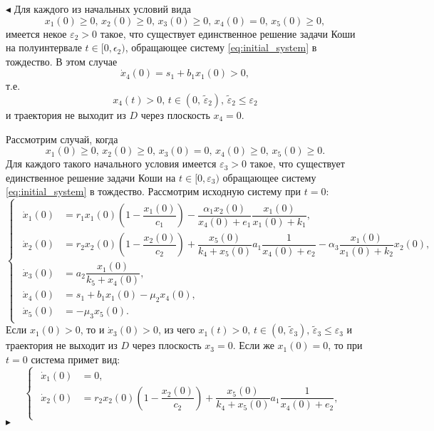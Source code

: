\documentclass[12pt,a4paper]{extarticle}
\renewenvironment{proof}{\noindent$\blacktriangleleft$}{$\blacktriangleright$}
\theoremstyle{definition}
\theoremstyle{definition}
\theoremstyle{definition}
\begin{document}
\begin{proof}
		Для каждого из начальных условий вида
		\begin{equation*}
			x_1(0)\ge0,\, x_2(0)\ge0,\, x_3(0)\ge0,\, x_4(0)=0,\, x_5(0)\ge0,
		\end{equation*}
		имеется некое $\varepsilon_2>0$ такое, что существует единственное решение задачи Коши на полуинтервале $t\in[0,\epsilon_2)$, обращающее систему \ref{eq:initial_system} в тождество. В этом случае 
		\[\dot{x}_4(0)=s_1+b_1x_1(0)>0,\]
		т.е. 
		\[x_4(t)>0,\, t\in(0,\, \tilde{\varepsilon}_2),\,\tilde{\varepsilon}_2\le\varepsilon_2\]
		и траектория не выходит из $D$ через плоскость $x_4=0$.
		
		Рассмотрим случай, когда
		\begin{equation}\label{eq:conds_3}
			x_1(0)\ge0,\, x_2(0)\ge0,\, x_3(0)=0,\, x_4(0)\ge0,\, x_5(0)\ge0.
		\end{equation}
		Для каждого такого начального условия имеется $\varepsilon_3>0$ такое, что существует единственное решение задачи Коши на $t\in[0,\varepsilon_3)$ обращающее систему \ref{eq:initial_system} в тождество. Рассмотрим исходную систему при $t=0$:
		\begin{equation*}
			\begin{cases}
				\begin{aligned}
					\dot{x}_1(0) &= r_1x_1(0)\left(1-\dfrac{x_1(0)}{c_1}\right)-\dfrac{\alpha_1x_2(0)}{x_4(0)+e_1}\dfrac{x_1(0)}{x_1(0)+k_1},\\
					\dot{x}_2(0) &= r_2x_2(0)\left(1-\dfrac{x_2(0)}{c_2}\right)+\dfrac{x_5(0)}{k_4+x_5(0)}a_1\dfrac{1}{x_4(0)+e_2}-\alpha_3\dfrac{x_1(0)}{x_1(0)+k_2}x_2(0),\\
					\dot{x}_3(0) &= a_2\dfrac{x_1(0)}{k_5+x_4(0)},\\
					\dot{x}_4(0) &= s_1 + b_1x_1(0)-\mu_2x_4(0),\\
					\dot{x}_5(0) &= -\mu_3x_5(0).
				\end{aligned}
			\end{cases}
		\end{equation*}
		Если $x_1(0)>0$, то и $\dot{x}_3(0)>0$, из чего $x_1(t)>0,\, t\in(0,\, \tilde{\varepsilon}_3),\,\tilde{\varepsilon}_3\le\varepsilon_3$ и траектория не выходит из $D$ через плоскость $x_3=0$. Если же $x_1(0)=0$, то при $t=0$ система примет вид:
		\begin{equation*}
			\begin{cases}
				\begin{aligned}
					\dot{x}_1(0) &= 0,\\
					\dot{x}_2(0) &= r_2x_2(0)\left(1-\dfrac{x_2(0)}{c_2}\right)+\dfrac{x_5(0)}{k_4+x_5(0)}a_1\dfrac{1}{x_4(0)+e_2},\\

\end{aligned}
\end{cases}
\end{equation*}
\end{proof}
\end{document}
